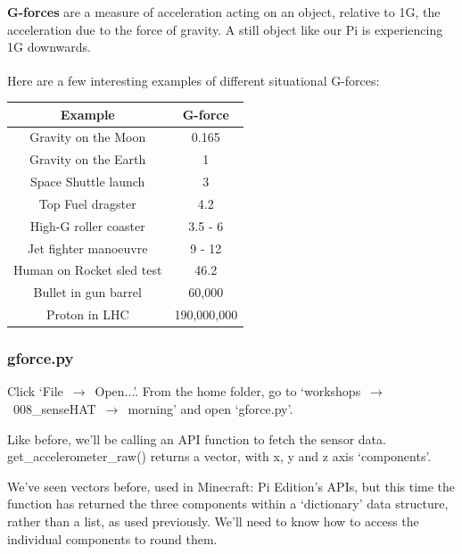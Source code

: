 \documentclass[a4paper, twocolumn, twoside, 12pt]{article}
\newenvironment{aside}
		{
		\begin{mdframed}[
			style=0,%
			leftline=false,
			rightline=false,
			innerbottommargin=2pt,
			innerleftmargin=12pt,
			innerrightmargin=0pt,
			linewidth=0.75pt,
			skipabove=6pt,
			skipbelow=6pt
			]
				\small
				\color{JungleGreen}
				\setlength{\parskip}{2pt}
				\vspace{2pt} %
		}
		{
		\end{mdframed}
		}
\begin{document}
		\begin{aside}
			\textbf{G-forces} are a measure of acceleration acting on an object, relative to 1G, the acceleration due to the force of gravity. A still object like our Pi is experiencing 1G downwards.
			
			Here are a few interesting examples of different situational G-forces:\textsuperscript{\cite{gforce}}
			\color{Black}
			\begin{tabular}{|c|c|}
				\hline \textbf{Example} & \textbf{G-force} \\ 
				\hline Gravity on the Moon & 0.165 \\ 
				\hline Gravity on the Earth & 1 \\ 
				\hline Space Shuttle launch & 3 \\ 
				\hline Top Fuel dragster & 4.2 \\ 
				\hline High-G roller coaster & 3.5 - 6 \\ 
				\hline Jet fighter manoeuvre & 9 - 12 \\ 
				\hline Human on Rocket sled test & 46.2 \\ 
				\hline Bullet in gun barrel & 60,000 \\ 
				\hline Proton in LHC & 190,000,000 \\ 
				\hline 
			\end{tabular}
		\end{aside}
		
		\subsubsection*{gforce.py}
		
			Click \mbox{`File $\rightarrow$ Open...'}.
			From the home folder, go to \mbox{`workshops $\rightarrow$ 008\_senseHAT $\rightarrow$ morning'} and open `gforce.py'.
		
			Like before, we'll be calling an API function to fetch the sensor data. get\_accelerometer\_raw() returns a vector, with x, y and z axis `components'.
		
			
		
			We've seen vectors before, used in Minecraft: Pi Edition's APIs, but this time the function has returned the three components within a `dictionary' data structure, rather than a list, as used previously. We'll need to know how to access the individual components to round them.
		
\end{document}
